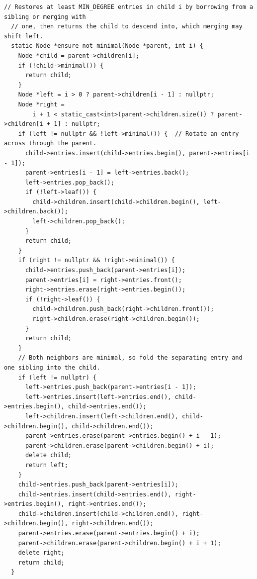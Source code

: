 \begin{lstlisting}[style=cpp]
  // Restores at least MIN_DEGREE entries in child i by borrowing from a sibling or merging with
  // one, then returns the child to descend into, which merging may shift left.
  static Node *ensure_not_minimal(Node *parent, int i) {
    Node *child = parent->children[i];
    if (!child->minimal()) {
      return child;
    }
    Node *left = i > 0 ? parent->children[i - 1] : nullptr;
    Node *right =
        i + 1 < static_cast<int>(parent->children.size()) ? parent->children[i + 1] : nullptr;
    if (left != nullptr && !left->minimal()) {  // Rotate an entry across through the parent.
      child->entries.insert(child->entries.begin(), parent->entries[i - 1]);
      parent->entries[i - 1] = left->entries.back();
      left->entries.pop_back();
      if (!left->leaf()) {
        child->children.insert(child->children.begin(), left->children.back());
        left->children.pop_back();
      }
      return child;
    }
    if (right != nullptr && !right->minimal()) {
      child->entries.push_back(parent->entries[i]);
      parent->entries[i] = right->entries.front();
      right->entries.erase(right->entries.begin());
      if (!right->leaf()) {
        child->children.push_back(right->children.front());
        right->children.erase(right->children.begin());
      }
      return child;
    }
    // Both neighbors are minimal, so fold the separating entry and one sibling into the child.
    if (left != nullptr) {
      left->entries.push_back(parent->entries[i - 1]);
      left->entries.insert(left->entries.end(), child->entries.begin(), child->entries.end());
      left->children.insert(left->children.end(), child->children.begin(), child->children.end());
      parent->entries.erase(parent->entries.begin() + i - 1);
      parent->children.erase(parent->children.begin() + i);
      delete child;
      return left;
    }
    child->entries.push_back(parent->entries[i]);
    child->entries.insert(child->entries.end(), right->entries.begin(), right->entries.end());
    child->children.insert(child->children.end(), right->children.begin(), right->children.end());
    parent->entries.erase(parent->entries.begin() + i);
    parent->children.erase(parent->children.begin() + i + 1);
    delete right;
    return child;
  }


\end{lstlisting}
